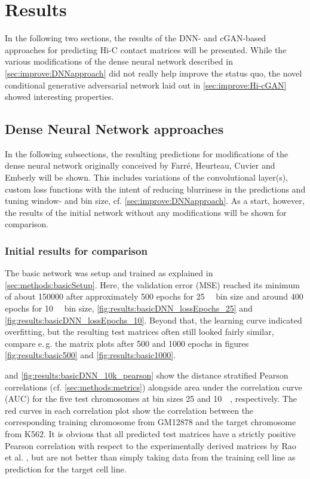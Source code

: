 \section{Results}
In the following two sections, 
the results of the DNN- and cGAN-based approaches for predicting Hi-C contact matrices will be presented.
While the various modifications of the dense neural network described in \cref{sec:improve:DNNapproach} 
did  not really help improve the status quo, the novel conditional generative adversarial network laid out in \cref{sec:improve:Hi-cGAN}
showed interesting properties.

\subsection{Dense Neural Network approaches} \label{sec:results:DNN}
In the following subsections, the resulting predictions for modifications of the dense neural network originally conceived 
by Farr\'e, Heurteau, Cuvier and Emberly \cite{Farre2018a} will be shown. 
This includes variations of the convolutional layer(s), custom loss functions with the intent of reducing blurriness in the predictions
and tuning window- and bin size, cf. \cref{sec:improve:DNNapproach}.
As a start, however, the results of the initial network without any modifications will be shown for comparison.

\subsubsection{Initial results for comparison} \label{sec:initialDNNresults}
The basic network was setup and trained as explained in \cref{sec:methods:basicSetup}.
Here, the validation error (MSE) reached its minimum of about \SI{150000}{} 
after approximately 500 epochs for \SI{25}{\kilo\bp} bin size and around 400 epochs for \SI{10}{\kilo\bp} bin size, \cref{fig:results:basicDNN_lossEpochs_25} and \ref{fig:results:basicDNN_lossEpochs_10}.
Beyond that, the learning curve indicated overfitting, but the resulting test matrices often still looked fairly similar, 
compare e.\,g. the matrix plots after 500 and 1000 epochs in figures \ref{fig:results:basic500} and \ref{fig:results:basic1000}.

 and \cref{fig:results:basicDNN_10k_pearson} 
show the distance stratified Pearson correlations (cf. \cref{sec:methods:metrics}) 
alongside area under the correlation curve (AUC) for the five test chromosomes at bin sizes 25 and \SI{10}{\kilo\bp}, respectively.
The red curves in each correlation plot show the correlation between the corresponding training chromosome from GM12878 and the target chromosome from K562.
It is obvious that all predicted test matrices have a strictly positive Pearson correlation with respect to the experimentally derived matrices by Rao et al. \cite{Rao2014},
but are not better than simply taking data from the training cell line as prediction for the target cell line.

